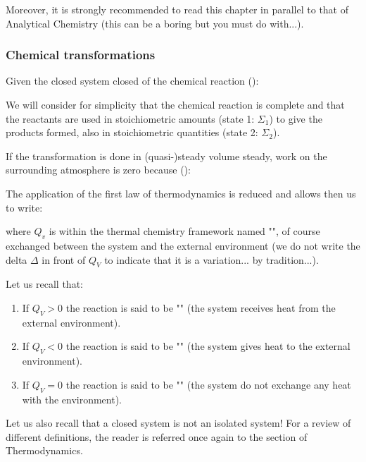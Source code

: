 	Moreover, it is strongly recommended to read this chapter in parallel to that of Analytical Chemistry (this can be a boring but you must do with...).
	
	\subsubsection{Chemical transformations}
	Given the closed system closed of the chemical reaction ():
	
	We will consider for simplicity that the chemical reaction is complete and that the reactants are used in stoichiometric amounts (state 1: $\Sigma_1$) to give the products formed, also in stoichiometric quantities (state 2: $\Sigma_2$).
	
	If the transformation is done in (quasi-)steady volume steady, work on the surrounding atmosphere is zero because ():
	
	The application of the first law of thermodynamics is reduced and allows then us to write:
	
	where $Q_v$ is within the thermal chemistry framework named "", of course exchanged between the system and the external environment (we do not write the delta $\Delta$ in front of $Q_V$ to indicate that it is a variation... by tradition...).
	
	Let us recall that:
	
	\begin{enumerate}
		\item If $Q_V>0$ the reaction is said to be "" (the system receives heat from the external environment).
		
		\item If $Q_V<0$ the reaction is said to be "" (the system gives heat to the external environment).
		
		\item If $Q_V=0$ the reaction is said to be "" (the system do not exchange any heat with the environment).
	\end{enumerate}
	\begin{tcolorbox}[title=Remark,colframe=black,arc=10pt]
	Let us also recall that a closed system is not an isolated system! For a review of different definitions, the reader is referred once again to the section of Thermodynamics.
	\end{tcolorbox}
	
